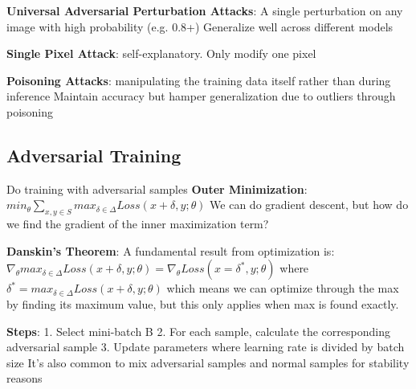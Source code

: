 \textbf{Universal Adversarial Perturbation Attacks}: 
A single perturbation on any image with high probability (e.g. 0.8+)
Generalize well across different models

\textbf{Single Pixel Attack}:
self-explanatory. Only modify one pixel

\textbf{Poisoning Attacks}:
manipulating the training data itself rather than during inference
Maintain accuracy but hamper generalization due to outliers through poisoning

\subsection*{Adversarial Training}
Do training with adversarial samples
\textbf{Outer Minimization}:
$min_{\theta}\sum\limits_{x, y \in S} max_{\delta \in \Delta} Loss(x + \delta, y; \theta)$
We can do gradient descent, but how do we find the gradient of the inner maximization term? 

\textbf{Danskin's Theorem}: 
A fundamental result from optimization is: 
$\nabla_{\theta}max_{\delta \in \Delta} Loss(x + \delta, y; \theta) = \nabla_{\theta}Loss(x = \delta^{*}, y; \theta)$
where
$\delta^{*}=max_{\delta \in \Delta} Loss(x + \delta, y; \theta)$
which means we can optimize through the max by finding its maximum value, but this only applies when max is found exactly. 

\textbf{Steps}: 
1. Select mini-batch B
2. For each sample, calculate the corresponding adversarial sample 
3. Update parameters where learning rate is divided by batch size
It's also common to mix adversarial samples and normal samples for stability reasons


